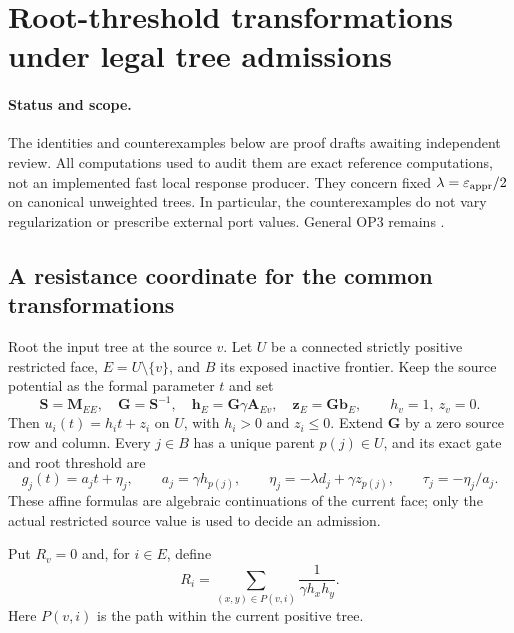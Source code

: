 \section{Root-threshold transformations under legal tree admissions}
\label{sec:op3-root-threshold-groups}

\paragraph{Status and scope.}
The identities and counterexamples below are \statusproved{} proof drafts
awaiting independent review. All computations used to audit them are exact
reference computations, not an implemented fast local response producer.
They concern fixed $\lambda=\varepsilon_{\mathrm{appr}}/2$ on canonical unweighted trees.
In particular, the counterexamples do not vary regularization or prescribe
external port values. General OP3 remains \statusopen.

\subsection{A resistance coordinate for the common transformations}

Root the input tree at the source $v$. Let $U$ be a connected strictly
positive restricted face, $E=U\setminus\{v\}$, and $B$ its exposed inactive
frontier. Keep the source potential as the formal parameter $t$ and set
\[
 \bm S=\bm M_{EE},\quad \bm G=\bm S^{-1},\quad
 \bm h_E=\bm G\gamma\bm A_{Ev},\quad
 \bm z_E=\bm G\bm b_E,
 \qquad h_v=1,\ z_v=0.
\]
Then $u_i(t)=h_it+z_i$ on $U$, with $h_i>0$ and $z_i\leq0$.
Extend $\bm G$ by a zero source row and column. Every $j\in B$ has a
unique parent $p(j)\in U$, and its exact gate and root threshold are
\begin{equation}
 g_j(t)=a_jt+\eta_j,\qquad
 a_j=\gamma h_{p(j)},\qquad
 \eta_j=-\lambda d_j+\gamma z_{p(j)},\qquad
 \tau_j=-\eta_j/a_j.
 \label{eq:op3-root-threshold-row}
\end{equation}
These affine formulas are algebraic continuations of the current face;
only the actual restricted source value is used to decide an admission.

Put $R_v=0$ and, for $i\in E$, define
\begin{equation}
 R_i=\sum_{(x,y)\in P(v,i)}\frac1{\gamma h_xh_y}.
 \label{eq:op3-harmonic-resistance}
\end{equation}
Here $P(v,i)$ is the path within the current positive tree.

